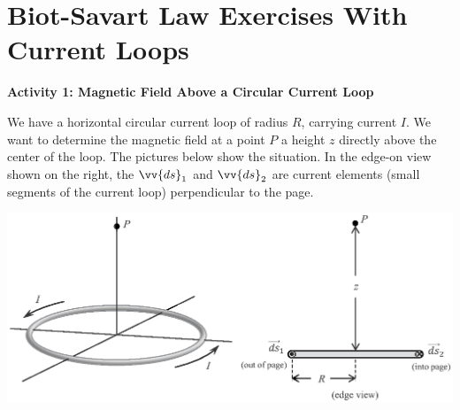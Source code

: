 \section{Biot-Savart Law Exercises With Current Loops}


\makelabheader %

\bigskip

\textbf{Activity 1: Magnetic Field Above a Circular Current Loop}

We have a horizontal 
circular current loop of radius $R$, carrying
current $I$.  We want to determine the magnetic field at a point $P$ a
height $z$ directly above the center of the loop.
The pictures below show the situation.  In the edge-on view shown on the right, 
the $\vv{ds}_1$ and $\vv{ds}_2$ are current elements (small segments of the current loop) perpendicular
to the page.

\vskip 0.4in
\begin{center}
\includegraphics{biot_savart_above_loops/circular_loop_3d.eps}
\end{center}

